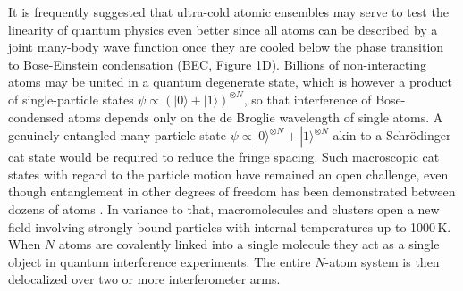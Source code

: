 \documentclass[12pt]{article}
\begin{document}
It is frequently suggested that ultra-cold atomic ensembles may serve to test the linearity of quantum physics 
even better since all atoms can be described by a joint many-body wave function once they are cooled below the phase transition to Bose-Einstein condensation (BEC, Figure 1D). 
\nocite{Kohstall2011}
Billions of non-interacting atoms may be united in a quantum degenerate state, which is however a product of single-particle states $\psi\propto(|0\rangle+|1\rangle)^{\otimes N}$, so that interference of Bose-condensed atoms depends only on the de Broglie wavelength of single atoms. A genuinely entangled many particle state $\psi\propto|0\rangle^{\otimes N}+|1\rangle^{\otimes N} $ akin to a Schr{\"o}dinger cat state would be required to reduce the fringe spacing. Such macroscopic cat states 
with regard to the particle motion
have remained an open challenge,
even though entanglement in other degrees of freedom has been demonstrated between dozens of atoms  \cite{Riedel2010,Gross2010,Sherson2006}.
In variance to that, macromolecules and clusters open a new 
field
involving strongly bound
particles 
with internal temperatures up to 1000\,K. When $N$ atoms
are covalently linked into a single molecule they act as a single object in quantum interference experiments. 
The entire $N$-atom system is then delocalized over two or more interferometer arms. 
\end{document}
